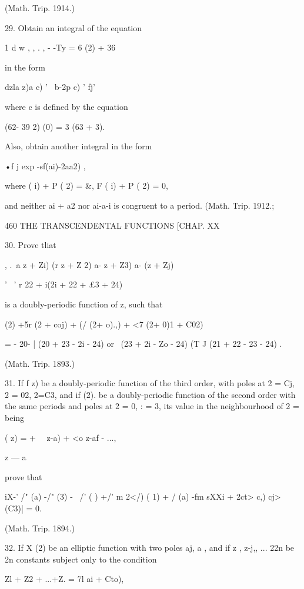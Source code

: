 {(Math. Trip. 1914.) 

29. Obtain an integral of the equation 

1 d w  ,  , .  , 
- -Ty = 6 (2) + 36 



in the form 



dzla z)a c) ' \ b-2p c)   ' fj' 



where c is defined by the equation 

(62- 39 2) (0) = 3 (63 + 3). 

Also, obtain another integral in the form 

 •f j  exp -sf(ai)-2aa2) , 

where  ( i) + P ( 2) = \&, F ( i) + P ( 2) = 0, 

and neither ai + a2 nor ai-a-i is congruent to a period. (Math. Trip. 1912.; 



460 THE TRANSCENDENTAL FUNCTIONS [CHAP. XX 

30. Prove tliat 

, .\ a z + Zi) (r z + Z 2) a-  z + Z3) a- (z + Zj) 

  '~ '  r 22 + i(2i + 22 + £3 + 24)  

is a doubly-periodic function of z, such that 

  (2) +5r (2 + coj) + (/ (2+ o).,) + <7 (2+ 0)1 + C02) 

= - 20-  | (20 + 23 - 2i - 24)  or  \ (23 + 2i - Zo - 24)  (T  J (21 + 22 - 23 - 24) . 

(Math. Trip. 1893.) 

31. If f z) be a doubly-periodic function of the third order, with poles at 2 = Cj, 2 = 02, 
2=C3, and if   (2). be a doubly-periodic function of the second order with the same periods 
and poles at 2 = 0, : = 3, its value in the neighbourhood of 2 = being 

(  z) = + \ \   z-a) +  <o z-af -  ..., 

z — a 

prove that 

iX-'  /" (a) -/" (3)  - \  /' ( ) +/' m 2</) ( 1) +  / (a) -fm  sXXi + 2ct>  c,) cj> (C3)| = 0. 

(Math. Trip. 1894.) 

32. If X (2) be an elliptic function with two poles aj, a , and if z , z-j,, ... 22n be 2n 
constants subject only to the condition 

Zl + Z2 + ...+Z.  = 7l ai + Cto), 

}
